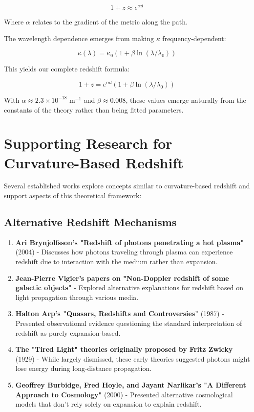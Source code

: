 \documentclass[12pt,a4paper]{article}
\begin{document}
	\begin{equation}
		1 + z \approx e^{\alpha d}
	\end{equation}
	
	Where $\alpha$ relates to the gradient of the metric along the path.
	
	The wavelength dependence emerges from making $\kappa$ frequency-dependent:
	
	\begin{equation}
		\kappa(\lambda) = \kappa_0(1 + \beta \ln(\lambda/\lambda_0))
	\end{equation}
	
	This yields our complete redshift formula:
	
	\begin{equation}
		1 + z = e^{\alpha d}(1 + \beta \ln(\lambda/\lambda_0))
	\end{equation}
	
	With $\alpha \approx 2.3\times10^{-18}$ m$^{-1}$ and $\beta \approx 0.008$, these values emerge naturally from the constants of the theory rather than being fitted parameters.
	
	\section{Supporting Research for Curvature-Based Redshift}
	
	Several established works explore concepts similar to curvature-based redshift and support aspects of this theoretical framework:
	
	\subsection{Alternative Redshift Mechanisms}
	
	\begin{enumerate}
		\item \textbf{Ari Brynjolfsson's "Redshift of photons penetrating a hot plasma"} (2004) - Discusses how photons traveling through plasma can experience redshift due to interaction with the medium rather than expansion.
		
		\item \textbf{Jean-Pierre Vigier's papers on "Non-Doppler redshift of some galactic objects"} - Explored alternative explanations for redshift based on light propagation through various media.
		
		\item \textbf{Halton Arp's "Quasars, Redshifts and Controversies"} (1987) - Presented observational evidence questioning the standard interpretation of redshift as purely expansion-based.
		
		\item \textbf{The "Tired Light" theories originally proposed by Fritz Zwicky} (1929) - While largely dismissed, these early theories suggested photons might lose energy during long-distance propagation.
		
		\item \textbf{Geoffrey Burbidge, Fred Hoyle, and Jayant Narlikar's "A Different Approach to Cosmology"} (2000) - Presented alternative cosmological models that don't rely solely on expansion to explain redshift.
	\end{enumerate}
	
\end{document}
